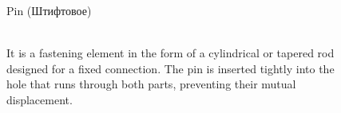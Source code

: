 \documentclass[aspectratio=169]{beamer}
\begin{document}
\begin{frame}[t]{Pin (Штифтовое)}
    \framesubtitle{}
    \begin{columns}[T,onlytextwidth]
        \begin{column}{0.49\textwidth}
            It is a fastening element in the form of a cylindrical or tapered rod designed for a fixed connection. The pin is inserted tightly into the hole that runs through both parts, preventing their mutual displacement.
        \end{column}
        \begin{column}{0.49\textwidth}
            \begin{figure}[H]
                \centering\includegraphics[height=5cm,width=1\textwidth,keepaspectratio]{stift.jpg}
                \label{fig:stift.jpg}
            \end{figure}
        \end{column}
    \end{columns}
\end{frame}
\end{document}
